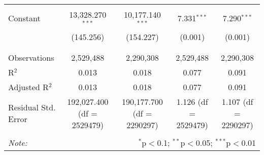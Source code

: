\begin{table}[H]
{\begin{tabular}{@{\extracolsep{5pt}}lcccc}
   & & & & \\  

  Constant & 13,328.270$^{***}$ & 10,177.140$^{***}$ & 7.331$^{***}$ & 7.290$^{***}$ \\  

   & (145.256) & (154.227) & (0.001) & (0.001) \\  

   & & & & \\  

 \hline \\[-1.8ex]  

 Observations & 2,529,488 & 2,290,308 & 2,529,488 & 2,290,308 \\  

 R$^{2}$ & 0.013 & 0.018 & 0.077 & 0.091 \\  

 Adjusted R$^{2}$ & 0.013 & 0.018 & 0.077 & 0.091 \\  

 Residual Std. Error & 192,027.400 (df = 2529479) & 190,177.700 (df = 2290297) & 1.126 (df = 2529479) & 1.107 (df = 2290297) \\  

 \hline  

 \hline \\[-1.8ex]  

 \textit{Note:}  & \multicolumn{4}{r}{$^{*}$p$<$0.1; $^{**}$p$<$0.05; $^{***}$p$<$0.01} \\  

 \end{tabular}}  

 \end{table}  

 



